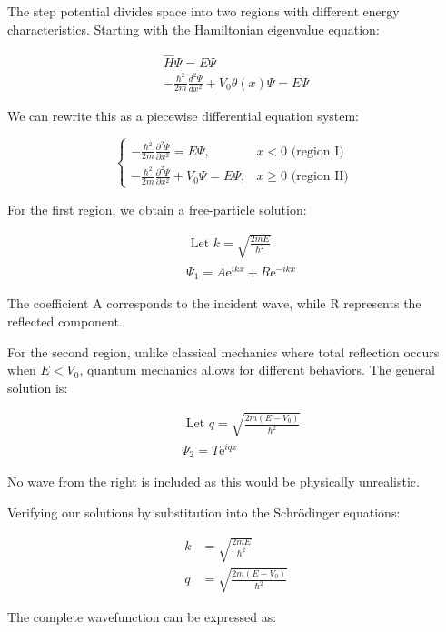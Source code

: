 \documentclass[italian]{HKNdocument}
\begin{document}
The step potential divides space into two regions with different energy characteristics. Starting with the Hamiltonian eigenvalue equation:

\begin{gather}
\hat{H} \Psi=E \Psi  \\
-\frac{\hbar^{2}}{2 m} \frac{d^{2} \Psi}{d x^{2}}+V_{0} \theta(x) \Psi=E \Psi
\end{gather}

We can rewrite this as a piecewise differential equation system:

\[
\begin{cases}-\frac{\hbar^{2}}{2 m} \frac{\partial^{2} \Psi}{\partial x^{2}}=E \Psi, & x<0 \text { (region I) }  \\ -\frac{\hbar^{2}}{2 m} \frac{\partial^{2} \Psi}{\partial x^{2}}+V_{0} \Psi=E \Psi, & x \geq 0 \text { (region II) }\end{cases}
\]

For the first region, we obtain a free-particle solution:

\begin{align}
& \text { Let } k=\sqrt{\frac{2 m E}{\hbar^{2}}}  \\
& \Psi_{1}=A \mathrm{e}^{i k x}+R \mathrm{e}^{-i k x}
\end{align}

The coefficient A corresponds to the incident wave, while R represents the reflected component.

For the second region, unlike classical mechanics where total reflection occurs when $E < V_0$, quantum mechanics allows for different behaviors. The general solution is:

\begin{align}
& \text { Let } q=\sqrt{\frac{2 m\left(E-V_{0}\right)}{\hbar^{2}}}  \\
& \Psi_{2}=T \mathrm{e}^{i q x}
\end{align}

No wave from the right is included as this would be physically unrealistic.

Verifying our solutions by substitution into the Schrödinger equations:

\begin{align}
k & =\sqrt{\frac{2 m E}{\hbar^{2}}}  \\
q & =\sqrt{\frac{2 m\left(E-V_{0}\right)}{\hbar^{2}}}
\end{align}

The complete wavefunction can be expressed as:
\end{document}
